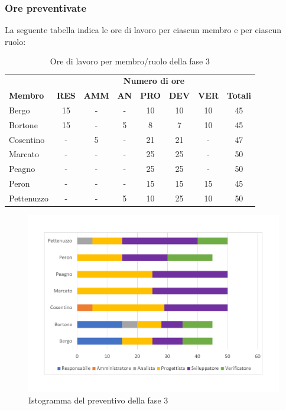 	\subsubsection{Ore preventivate}
		La seguente tabella indica le ore di lavoro per ciascun membro e per ciascun ruolo:
		\begin{table}[H]
			\centering
			\begin{tabular}{| l | c c c c c c | c |}
				\rowcolor{LightBlue}
				& \multicolumn{7}{c}{\textbf{\color{white}Numero di ore}}	\\
	
				\rowcolor{LightBlue}
				\textbf{\color{white}Membro}
				& \textbf{\color{white}RES}
				& \textbf{\color{white}AMM}
				& \textbf{\color{white}AN}
				& \textbf{\color{white}PRO}
				& \textbf{\color{white}DEV}
				& \textbf{\color{white}VER}
				& \textbf{\color{white}Totali}\\
	
				Bergo      & 15 & - & - & 10 & 10 & 10 & 45 \\
				Bortone    & 15 & - & 5 & 8 & 7 & 10 & 45  \\
				Cosentino  & - & 5 & - & 21 & 21 & - & 47 \\
				Marcato    & - & - & - & 25 & 25 & - & 50 \\
				Peagno     & - & - & - & 25 & 25 & - & 50 \\
				Peron      & - & - & - & 15 & 15 & 15 & 45 \\
				Pettenuzzo & - & - & 5 & 10 & 25 & 10 & 50 \\ \hline
			\end{tabular}
			\caption{Ore di lavoro per membro/ruolo della fase 3}
		\end{table}
		
	\begin{figure}[h]
	\centering
	\includegraphics[scale=0.45]{images/preventivoRQ.pdf}
	\caption{Istogramma del preventivo della fase 3}
\end{figure}

